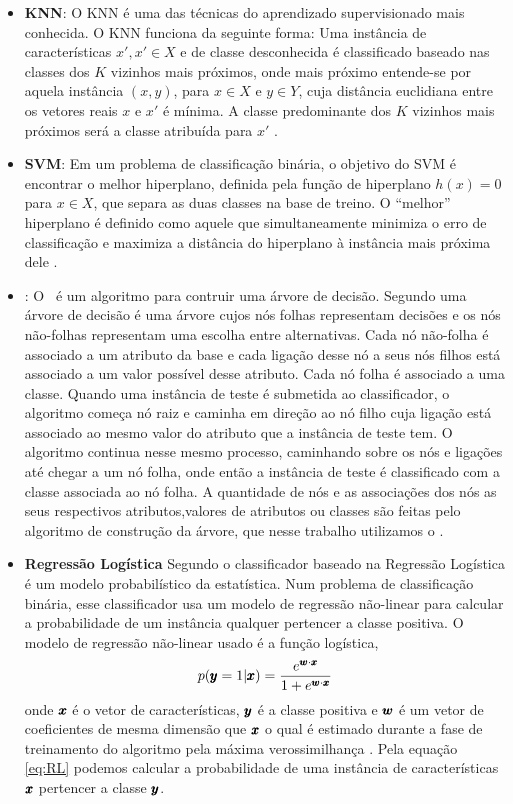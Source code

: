 \begin{itemize}
 \item \textbf{KNN}: O KNN é uma das técnicas do aprendizado supervisionado mais conhecida. 
 O KNN funciona da seguinte forma: Uma instância de características $x',x'\in X$
 e de classe desconhecida é classificado baseado
 nas classes dos $K$ vizinhos mais próximos, onde mais próximo entende-se por aquela instância
 $(x,y)$, para $x \in X$ e $y \in Y$,
 cuja distância euclidiana entre os vetores reais $x$ e $x'$ é mínima. 
 A classe predominante dos $K$ vizinhos mais próximos será a classe atribuída para $x'$ \cite{topalgos2008}.
 
 \item \textbf{SVM}: 
 Em um problema de classificação binária, o objetivo do SVM é encontrar o melhor hiperplano, 
 definida pela função de hiperplano $h(x)=0$ para $x \in X$,
 que separa as duas classes na base de treino.
 O ``melhor'' hiperplano é definido como aquele que simultaneamente minimiza
 o erro de classificação e maximiza a distância do hiperplano à instância mais próxima dele \cite{topalgos2008}. 
 
 
 \item \textbf{\jqo}: 
 O \jqo~é um algoritmo para contruir uma árvore de decisão.
 Segundo \cite{peng2009implementation} uma árvore de decisão é uma
 árvore cujos nós folhas representam decisões e os nós não-folhas representam
 uma escolha entre alternativas. Cada nó não-folha é associado a um atributo da base e
 cada ligação desse nó a seus nós filhos está associado a um valor possível desse atributo.
 Cada nó folha é associado a uma classe.
 Quando uma instância de teste é submetida ao classificador, o algoritmo começa nó raiz e caminha
 em direção ao nó filho cuja ligação está associado ao mesmo valor do atributo que a instância de teste tem.
 O algoritmo continua nesse mesmo processo, caminhando sobre os nós e ligações até chegar a um nó folha, onde então
 a instância de teste é classificado com a classe associada ao nó folha.
 A quantidade de nós e as associações dos nós as seus respectivos atributos,valores de atributos ou classes
 são feitas pelo algoritmo
 de construção da árvore, que nesse trabalho utilizamos o \jqo.

 \item \textbf{Regressão Logística}
 Segundo \cite{james2013introduction} o classificador baseado na Regressão Logística 
 é um modelo probabilístico da estatística. Num problema de classificação binária,
 esse classificador usa um modelo de regressão não-linear
 para calcular a probabilidade de um instância qualquer pertencer a classe positiva.
 O modelo de regressão não-linear usado é a função logística, 
 \begin{equation} \label{eq:RL}
  p({\pmb{y}}=1|{\pmb{x}}) = \frac{e^{{\pmb{w}} \cdot {\pmb{x}}}}{1+e^{{\pmb{w}} \cdot {\pmb{x}}}}
 \end{equation}
onde ${\pmb{x}}$ é o vetor de características, ${\pmb{y}}$ é a classe positiva e ${\pmb{w}}$ é um vetor de coeficientes de mesma dimensão
que ${\pmb{x}}$ o qual é estimado durante a fase de treinamento do algoritmo pela máxima verossimilhança \cite{james2013introduction}.
Pela equação \ref{eq:RL} podemos calcular a probabilidade de uma instância de características ${\pmb{x}}$ pertencer a classe ${\pmb{y}}$.
 

\end{itemize}
